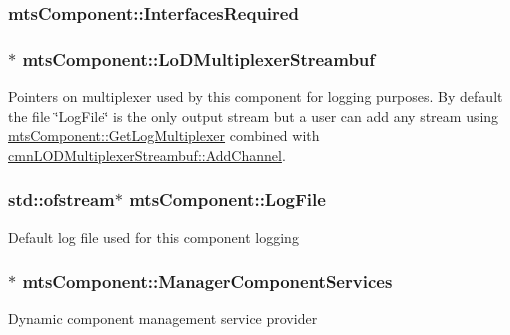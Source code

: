 \subsubsection[{Interfaces\+Required}]{ mts\+Component\+::\+Interfaces\+Required\hspace{0.3cm}{\ttfamily [protected]}}\label{classmts_component_a41da426dbdbe602272c9ab0d8958bfd4}
\hypertarget{classmts_component_a870d5405720c2b9fc95223a1723712fd}{}
\subsubsection[{Lo\+D\+Multiplexer\+Streambuf}]{$\ast$ mts\+Component\+::\+Lo\+D\+Multiplexer\+Streambuf\hspace{0.3cm}{\ttfamily [protected]}}\label{classmts_component_a870d5405720c2b9fc95223a1723712fd}
Pointers on multiplexer used by this component for logging purposes. By default the file \char`\"{}\+Log\+File\char`\"{} is the only output stream but a user can add any stream using \hyperlink{classmts_component_a368c7115c8d9533d634077b2d76af18b}{mts\+Component\+::\+Get\+Log\+Multiplexer} combined with \hyperlink{classcmn_l_o_d_multiplexer_streambuf_a13062543394fee2e08419f0ecad3b5c1}{cmn\+L\+O\+D\+Multiplexer\+Streambuf\+::\+Add\+Channel}. \hypertarget{classmts_component_a5174cc0d7c4802fb479c0d065b79052f}{}
\subsubsection[{Log\+File}]{\setlength{\rightskip}{0pt plus 5cm}std\+::ofstream$\ast$ mts\+Component\+::\+Log\+File\hspace{0.3cm}{\ttfamily [protected]}}\label{classmts_component_a5174cc0d7c4802fb479c0d065b79052f}
Default log file used for this component logging \hypertarget{classmts_component_ae405a53b19cda763738c768fc2e6d5b9}{}
\subsubsection[{Manager\+Component\+Services}]{$\ast$ mts\+Component\+::\+Manager\+Component\+Services\hspace{0.3cm}{\ttfamily [protected]}}\label{classmts_component_ae405a53b19cda763738c768fc2e6d5b9}
Dynamic component management service provider \hypertarget{classmts_component_a506cd73bf8afc8286ddf8d933b1b1658}{}
